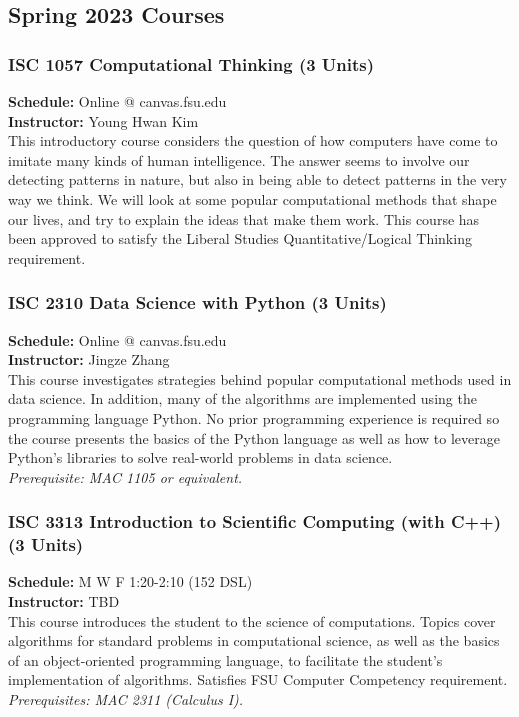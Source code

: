 \documentclass[12pt,a4paper]{article}
\begin{document}
\subsection{Spring 2023 Courses}
\subsubsection*{ISC 1057 Computational Thinking (3 Units)}
\textbf{Schedule:} Online @ canvas.fsu.edu \\
\textbf{Instructor:} Young Hwan Kim \\
This introductory course considers the question of how computers have come to imitate many kinds of human intelligence. The answer seems to involve our detecting patterns in nature, but also in being able to detect patterns in the very way we think. We will look at some popular computational methods that shape our lives, and try to explain the ideas that make them work. This course has been approved to satisfy the Liberal Studies Quantitative/Logical Thinking requirement.

\subsubsection*{ISC 2310 Data Science with Python (3 Units)}
\textbf{Schedule:} Online @ canvas.fsu.edu \\
\textbf{Instructor:} Jingze Zhang \\
This course investigates strategies behind popular computational methods used in data science. In addition, many of the algorithms are implemented using the programming language Python. No prior programming experience is required so the course presents the basics of the Python language as well as how to leverage Python’s libraries to solve real-world problems in data science. \\
\textit{Prerequisite: MAC 1105 or equivalent.}

\subsubsection*{ISC 3313 Introduction to Scientific Computing (with C++) (3 Units)}
\textbf{Schedule:} M W F 1:20-2:10 (152 DSL) \\
\textbf{Instructor:} TBD \\
This course introduces the student to the science of computations. Topics cover algorithms for standard problems in computational science, as well as the basics of an object-oriented programming language, to facilitate the student’s implementation of algorithms. Satisfies FSU Computer Competency requirement. \\
\textit{Prerequisites: MAC 2311 (Calculus I).}
\end{document}
